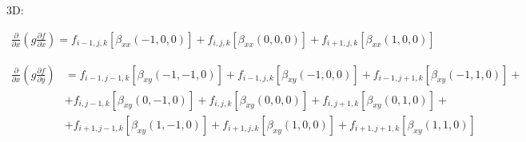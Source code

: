 3D:

\begin{equation*}
    \begin{split}
        \frac
            {\partial}
            {\partial x}
        \left(
            g
            \frac
                {\partial f}
                {\partial x}
        \right)
        =
        f_{i-1, j, k}
        \left[
            \beta_{xx} \left(-1, 0, 0\right)
        \right]
        +
        f_{i, j, k}
        \left[
            \beta_{xx} \left(0, 0, 0\right)
        \right]
        +
        f_{i+1, j, k}
        \left[
            \beta_{xx} \left(1, 0, 0\right)
        \right]
    \end{split}
\end{equation*}

\begin{equation*}
    \begin{split}
        \frac
            {\partial}
            {\partial x}
        \left(
            g
            \frac
                {\partial f}
                {\partial y}
        \right)
        &
        =
        f_{i-1, j-1, k}
        \left[
            \beta_{xy} \left(-1, -1, 0\right)
        \right]
        +
        f_{i-1, j, k}
        \left[
            \beta_{xy} \left(-1, 0, 0\right)
        \right]
        +
        f_{i-1, j+1, k}
        \left[
            \beta_{xy} \left(-1, 1, 0\right)
        \right]
        +
        \\
        &
        +
        f_{i, j-1, k}
        \left[
            \beta_{xy} \left(0,-1, 0\right)
        \right]
        +
        f_{i, j, k}
        \left[
            \beta_{xy} \left(0, 0, 0\right)
        \right]
        +
        f_{i, j+1, k}
        \left[
            \beta_{xy} \left(0, 1, 0\right)
        \right]
        +
        \\
        &
        +
        f_{i+1, j-1, k}
        \left[
            \beta_{xy} \left(1, -1, 0\right)
        \right]
        +
        f_{i+1, j, k}
        \left[
            \beta_{xy} \left(1, 0, 0\right)
        \right]
        +
        f_{i+1, j+1, k}
        \left[
            \beta_{xy} \left(1, 1, 0\right)
        \right]
    \end{split}
\end{equation*}

